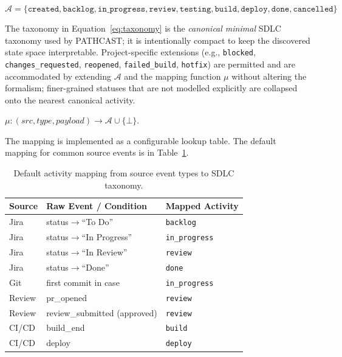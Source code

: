 \begin{definition}
\label{def:activity-taxonomy}
\begin{equation}
\label{eq:taxonomy}
\mathcal{A} = \{\texttt{created}, \texttt{backlog}, \texttt{in\_progress},
    \texttt{review}, \texttt{testing}, \texttt{build}, \texttt{deploy},
    \texttt{done}, \texttt{cancelled}\}
\end{equation}
\end{definition}

The taxonomy in Equation~\ref{eq:taxonomy} is the \emph{canonical minimal}
SDLC taxonomy used by PATHCAST; it is intentionally compact to keep the
discovered state space interpretable. Project-specific extensions (e.g.,
\texttt{blocked}, \texttt{changes\_requested}, \texttt{reopened},
\texttt{failed\_build}, \texttt{hotfix}) are permitted and are accommodated
by extending $\mathcal{A}$ and the mapping function $\mu$ without altering
the formalism; finer-grained statuses that are not modelled explicitly are
collapsed onto the nearest canonical activity.

\begin{definition}
\label{def:activity-map}
$\mu : (src, type, payload) \to \mathcal{A} \cup \{\bot\}$.
\end{definition}

The mapping is implemented as a configurable lookup table. The default
mapping for common source events is in Table~\ref{tab:activity-mapping}.

\begin{table}[htbp]
\centering
\caption{Default activity mapping from source event types to SDLC taxonomy.}
\label{tab:activity-mapping}
\small
\begin{tabular}{lll}
\toprule
\textbf{Source} & \textbf{Raw Event / Condition} & \textbf{Mapped Activity} \\
\midrule
Jira   & status$\to$``To Do''         & \texttt{backlog} \\
Jira   & status$\to$``In Progress''   & \texttt{in\_progress} \\
Jira   & status$\to$``In Review''     & \texttt{review} \\
Jira   & status$\to$``Done''          & \texttt{done} \\
Git    & first commit in case          & \texttt{in\_progress} \\
Review & pr\_opened                    & \texttt{review} \\
Review & review\_submitted (approved)  & \texttt{review} \\
CI/CD  & build\_end                    & \texttt{build} \\
CI/CD  & deploy                        & \texttt{deploy} \\
\bottomrule
\end{tabular}
\end{table}



